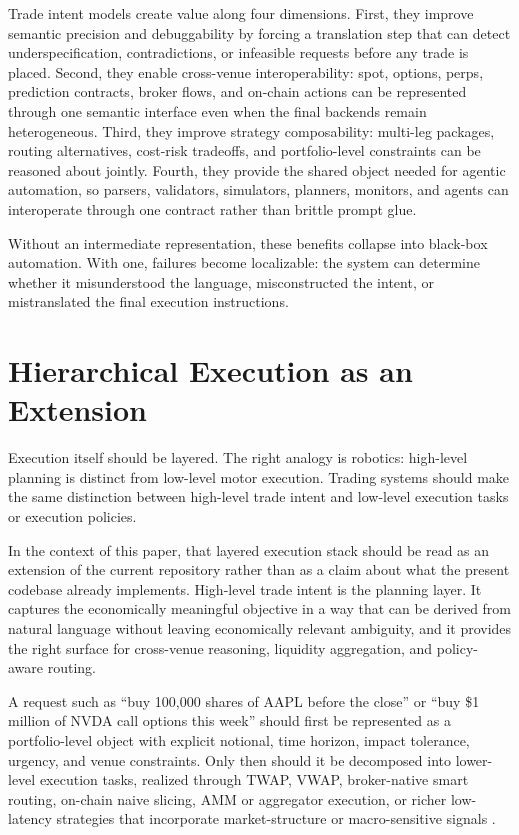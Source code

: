 \documentclass{article}
\begin{document}
Trade intent models create value along four dimensions. First, they improve semantic precision and debuggability by forcing a translation step that can detect underspecification, contradictions, or infeasible requests before any trade is placed. Second, they enable cross-venue interoperability: spot, options, perps, prediction contracts, broker flows, and on-chain actions can be represented through one semantic interface even when the final backends remain heterogeneous. Third, they improve strategy composability: multi-leg packages, routing alternatives, cost-risk tradeoffs, and portfolio-level constraints can be reasoned about jointly. Fourth, they provide the shared object needed for agentic automation, so parsers, validators, simulators, planners, monitors, and agents can interoperate through one contract rather than brittle prompt glue.

Without an intermediate representation, these benefits collapse into black-box automation. With one, failures become localizable: the system can determine whether it misunderstood the language, misconstructed the intent, or mistranslated the final execution instructions.

\section{Hierarchical Execution as an Extension}

Execution itself should be layered. The right analogy is robotics: high-level planning is distinct from low-level motor execution. Trading systems should make the same distinction between high-level trade intent and low-level execution tasks or execution policies.

In the context of this paper, that layered execution stack should be read as an extension of the current repository rather than as a claim about what the present codebase already implements. High-level trade intent is the planning layer. It captures the economically meaningful objective in a way that can be derived from natural language without leaving economically relevant ambiguity, and it provides the right surface for cross-venue reasoning, liquidity aggregation, and policy-aware routing.

A request such as ``buy 100{,}000 shares of AAPL before the close'' or ``buy \$1 million of NVDA call options this week'' should first be represented as a portfolio-level object with explicit notional, time horizon, impact tolerance, urgency, and venue constraints. Only then should it be decomposed into lower-level execution tasks, realized through TWAP, VWAP, broker-native smart routing, on-chain naive slicing, AMM or aggregator execution, or richer low-latency strategies that incorporate market-structure or macro-sensitive signals \citep{bertsimas1998execution,almgren2001execution}.
\end{document}
